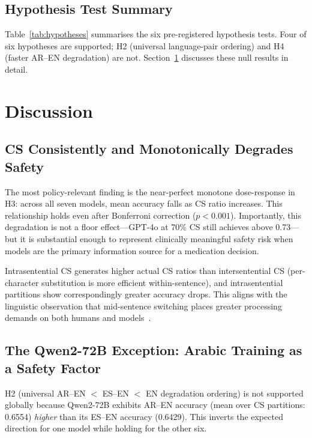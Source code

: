 

\subsection{Hypothesis Test Summary}

Table~\ref{tab:hypotheses} summarises the six pre-registered hypothesis
tests.
Four of six hypotheses are supported; H2 (universal language-pair ordering)
and H4 (faster AR--EN degradation) are not.
Section~\ref{sec:discussion} discusses these null results in detail.



\section{Discussion}
\label{sec:discussion}

\subsection{CS Consistently and Monotonically Degrades Safety}

The most policy-relevant finding is the near-perfect monotone dose-response
in H3: across all seven models, mean accuracy falls as CS ratio increases.
This relationship holds even after Bonferroni correction ($p < 0.001$).
Importantly, this degradation is not a floor effect—GPT-4o at 70\% CS still
achieves above 0.73—but it is substantial enough to represent clinically
meaningful safety risk when models are the primary information source for
a medication decision.

Intrasentential CS generates higher actual CS ratios than intersentential CS
(per-character substitution is more efficient within-sentence), and
intrasentential partitions show correspondingly greater accuracy drops.
This aligns with the linguistic observation that mid-sentence switching places
greater processing demands on both humans and models~\citep{Poplack1980}.

\subsection{The Qwen2-72B Exception: Arabic Training as a Safety Factor}

H2 (universal AR--EN $<$ ES--EN $<$ EN degradation ordering) is not
supported globally because Qwen2-72B exhibits AR--EN accuracy
(mean over CS partitions: 0.6554) \emph{higher} than its ES--EN accuracy
(0.6429)\simflag{}.
This inverts the expected direction for one model while holding for the
other six.

